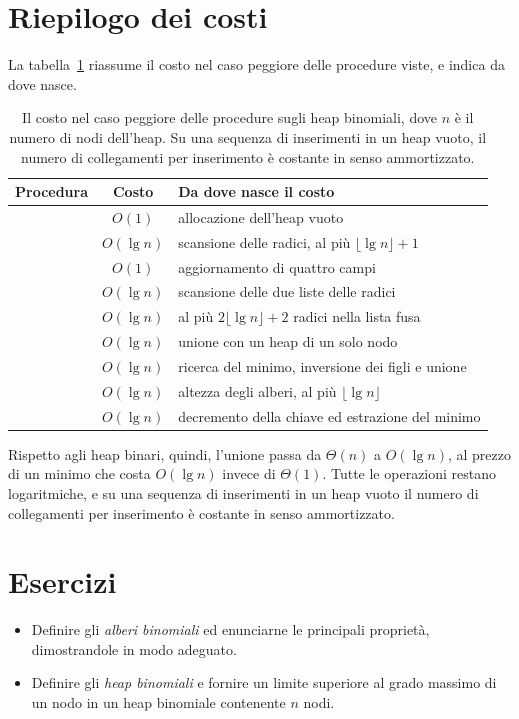 \section{Riepilogo dei costi}\label{sec:hb-costi}
La tabella~\ref{tab:hb-costi} riassume il costo nel caso peggiore delle procedure viste, e indica da dove nasce.

\begin{table}[htbp]
\centering
\small
\begin{tabular}{lcl}
\toprule
Procedura & Costo & Da dove nasce il costo \\
\midrule
\MakeBinomialHeap{} & $O(1)$ & allocazione dell'heap vuoto \\
\BinomialHeapMinimum{} & $O(\lg n)$ & scansione delle radici, al più $\lfloor \lg n \rfloor + 1$ \\
\BinomialLink{} & $O(1)$ & aggiornamento di quattro campi \\
\BinomialHeapMerge{} & $O(\lg n)$ & scansione delle due liste delle radici \\
\BinomialHeapUnion{} & $O(\lg n)$ & al più $2\lfloor \lg n \rfloor + 2$ radici nella lista fusa \\
\BinomialHeapInsert{} & $O(\lg n)$ & unione con un heap di un solo nodo \\
\BinomialHeapExtractMin{} & $O(\lg n)$ & ricerca del minimo, inversione dei figli e unione \\
\BinomialHeapDecreaseKey{} & $O(\lg n)$ & altezza degli alberi, al più $\lfloor \lg n \rfloor$ \\
\BinomialHeapDelete{} & $O(\lg n)$ & decremento della chiave ed estrazione del minimo \\
\bottomrule
\end{tabular}
\caption{Il costo nel caso peggiore delle procedure sugli heap binomiali, dove $n$ è il numero di nodi dell'heap. Su una sequenza di inserimenti in un heap vuoto, il numero di collegamenti per inserimento è costante in senso ammortizzato.}
\label{tab:hb-costi}
\end{table}

Rispetto agli heap binari, quindi, l'unione passa da $\Theta(n)$ a $O(\lg n)$, al prezzo di un minimo che costa $O(\lg n)$ invece di $\Theta(1)$. Tutte le operazioni restano logaritmiche, e su una sequenza di inserimenti in un heap vuoto il numero di collegamenti per inserimento è costante in senso ammortizzato.

\section{Esercizi}\label{sec:hb-esercizi}
\begin{esercizio}\label{es:hb-2024}
\begin{itemize}
    \item[(a)] Definire gli \emph{alberi binomiali} ed enunciarne le principali proprietà, dimostrandole in modo adeguato.
    \item[(b)] Definire gli \emph{heap binomiali} e fornire un limite superiore al grado massimo di un nodo in un heap binomiale contenente $n$ nodi.
\end{itemize}
\end{esercizio}

